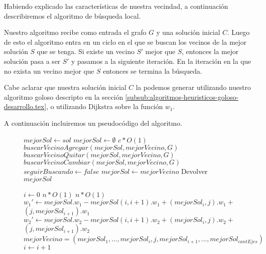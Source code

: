 Habiendo explicado las características de nuestra vecindad, a continuación describiremos el algoritmo de búsqueda local.

Nuestro algoritmo recibe como entrada el grafo $G$ y una solución inicial $C$. Luego de esto el algoritmo entra en un ciclo en el que se buscan los vecinos de la mejor solución $S$ que se tenga. Si existe un vecino $S'$ mejor que $S$, entonces la mejor solución pasa a ser $S'$ y pasamos a la siguiente iteración. En la iteración en la que no exista un vecino mejor que $S$ entonces se termina la búsqueda.

Cabe aclarar que nuestra solución inicial $C$ la podemos generar utilizando nuestro algoritmo goloso descripto en la sección \ref{subsub:algoritmos-heuristicos-goloso-desarrollo.tex}, o utilizando Dijkstra sobre la función $w_1$.

A continuación incluiremos un pseudocódigo del algoritmo.
\begin{center}
 \begin{figure}[H]
  \begin{pseudo}
   \State $mejorSol \leftarrow sol$
   \State $mejorSol \leftarrow \emptyset $
   \hfill$c*O(1)$
      \State $buscarVecinoAgregar(mejorSol, mejorVecino, G)$
      \State $buscarVecinoQuitar(mejorSol, mejorVecino, G)$
      \State $buscarVecinoCambiar(mejorSol, mejorVecino, G)$
	\State $seguirBuscando \leftarrow false$
      \Else
	\State $mejorSol \leftarrow mejorVecino$
      \EndIf
   \EndWhile
   \State Devolver $mejorSol$
   \EndProcedure
  \end{pseudo}
 \end{figure}
\end{center}

\begin{flushleft}
 \begin{figure}[H]
  \begin{pseudo}
   \State $i \leftarrow 0$
   \hfill$n*O(1)$
      \hfill$n*O(1)$
	  \State $w_1' \leftarrow mejorSol.w_1 - mejorSol(i,i+1).w_1 + (mejorSol_i,j).w_1 + $
	  \State $(j,mejorSol_{i+1}).w_1$
	  \State $w_2' \leftarrow mejorSol.w_2 - mejorSol(i,i+1).w_2 + (mejorSol_i,j).w_2 + $
	  \State $(j,mejorSol_{i+1}).w_2$
	    \State $mejorVecino = (mejorSol_1, ... ,mejorSol_i, j, mejorSol_{i+1}, ..., mejorSol_{cantEjes})$
	  \EndIf
      \EndFor
      \State $i \leftarrow i+1$
   \EndWhile
   \EndProcedure
  \end{pseudo}
 \end{figure}
\end{flushleft}

